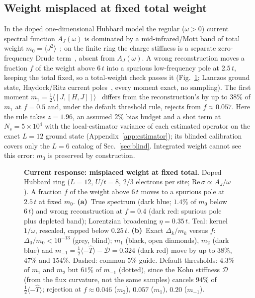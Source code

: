 \documentclass[submission, PhysCore]{SciPost}
\begin{document}
\subsection{Weight misplaced at fixed total weight}
\label{sec:fixedtotal}
In the doped one-dimensional Hubbard model the regular ($\omega>0$) current spectral function $A_J(\omega)$ is dominated by a mid-infrared/Mott band of total weight $m_0=\langle J^2\rangle$~\cite{Maldague1977,Basov2011}; on the finite ring the charge stiffness is a separate zero-frequency Drude term~\cite{Kohn1964}, absent from $A_J(\omega)$. A wrong reconstruction moves a fraction $f$ of the weight above $6\,t$ into a spurious low-frequency pole at $2.5\,t$, keeping the total fixed, so a total-weight check passes it (Fig.~\ref{fig:invfalsifier}; Lanczos ground state, Haydock/Ritz current poles~\cite{Haydock1972,Lanczos1950}, every moment exact, no sampling). The first moment $m_1=\tfrac{1}{2}\langle[J,[H,J]]\rangle$~\cite{Kohn1964,HohenbergMartin1965} differs from the reconstruction's by up to $38\%$ of $m_1$ at $f=0.5$ and, under the default threshold rule, rejects from $f\approx0.057$. Here the rule takes $z=1.96$, an assumed $2\%$ bias budget and a shot term at $N_s=5\times10^4$ with the local-estimator variance of each estimated operator on the exact $L=12$ ground state (Appendix~\ref{app:estimator}); its blinded calibration covers only the $L=6$ catalog of Sec.~\ref{sec:blind}. Integrated weight cannot see this error: $m_0$ is preserved by construction.

\begin{figure}[t]
\centering
{}
\caption{\textbf{Current response: misplaced weight at fixed total.} Doped Hubbard ring ($L=12$, $U/t=8$, $2/3$ electrons per site; $\mathrm{Re}\,\sigma\propto A_J/\omega$). A fraction $f$ of the weight above $6\,t$ moves to a spurious pole at $2.5\,t$ at fixed $m_0$. \textbf{(a)}~True spectrum (dark blue; $1.4\%$ of $m_0$ below $6\,t$) and wrong reconstruction at $f=0.4$ (dark red: spurious pole plus depleted band); Lorentzian broadening $\eta=0.35\,t$. Teal: kernel $1/\omega$, rescaled, capped below $0.25\,t$. \textbf{(b)}~Exact $\Delta_k/m_k$ versus $f$: $\Delta_0/m_0<10^{-13}$ (grey, blind); $m_1$ (black, open diamonds), $m_2$ (dark blue) and $m_{-1}=\tfrac12\langle-\hat T\rangle-\mathcal D=0.324$ (dark red) move by up to $38\%$, $47\%$ and $154\%$. Dashed: common $5\%$ guide. Default thresholds: $4.3\%$ of $m_1$ and $m_2$ but $61\%$ of $m_{-1}$ (dotted), since the Kohn stiffness $\mathcal D$ (from the flux curvature, not the same samples) cancels $94\%$ of $\tfrac12\langle-\hat T\rangle$; rejection at $f\approx0.046$ ($m_2$), $0.057$ ($m_1$), $0.20$ ($m_{-1}$).}
\label{fig:invfalsifier}
\end{figure}
\end{document}
